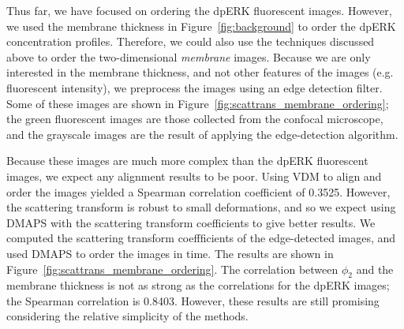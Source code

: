 \documentclass[10pt]{article}
\begin{document}
Thus far, we have focused on ordering the dpERK fluorescent images. 
%
However, we used the membrane thickness in Figure~\ref{fig:background} to order the dpERK concentration profiles. 
%
Therefore, we could also use the techniques discussed above to order the two-dimensional {\em membrane} images.
%
Because we are only interested in the membrane thickness, and not other features of the images (e.g. fluorescent intensity), we preprocess the images using an edge detection filter.
%
Some of these images are shown in Figure~\ref{fig:scattrans_membrane_ordering}; the green fluorescent images are those collected from the confocal microscope, and the grayscale images are the result of applying the edge-detection algorithm. 

Because these images are much more complex than the dpERK fluorescent images, we expect any alignment results to be poor.
%
Using VDM to align and order the images yielded a Spearman correlation coefficient of 0.3525.
%
However, the scattering transform is robust to small deformations, and so we expect using DMAPS with the scattering transform coefficients to give better results.
%
We computed the scattering transform coeffficients of the edge-detected images, and used DMAPS to order the images in time. 
%
The results are shown in Figure~\ref{fig:scattrans_membrane_ordering}.
%
The correlation between $\phi_2$ and the membrane thickness is not as strong as the correlations for the dpERK images; the Spearman correlation is 0.8403.
%
However, these results are still promising considering the relative simplicity of the methods. 
%
\end{document}
